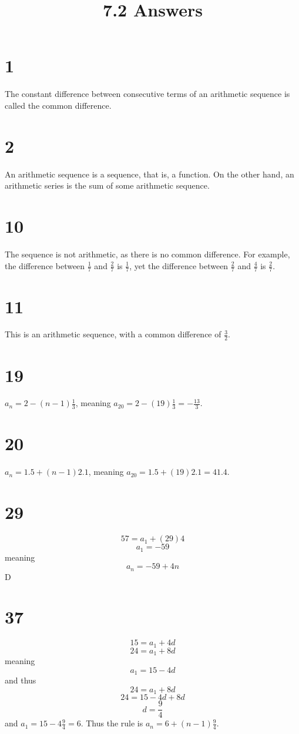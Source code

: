 \documentclass{article}
\title{7.2 Answers}
\theoremstyle{definition}
\newcommand{\?}{\stackrel{?}{=}}
\begin{document}
\maketitle

\section*{1}
The constant difference between consecutive terms of an arithmetic sequence is called the common difference.

\section*{2}
An arithmetic sequence is a sequence, that is, a function. On the other hand, an arithmetic series is the sum of some arithmetic sequence.

\section*{10}
The sequence is not arithmetic, as there is no common difference. For example, the difference between $\frac{1}{7}$ and $\frac{2}{7}$ is $\frac{1}{7}$, yet the difference between 
$\frac{2}{7}$ and $\frac{4}{7}$ is $\frac{2}{7}$.

\section*{11}
This is an arithmetic sequence, with a common difference of $\frac{3}{2}$.

\section*{19}
$a_n=2-(n-1)\frac{1}{3}$, meaning $a_{20}=2-(19)\frac{1}{3}=-\frac{13}{3}$.

\section*{20}
$a_n=1.5+(n-1)2.1$, meaning $a_{20}=1.5+(19)2.1=41.4$.

\section*{29}
\[ 57=a_1+(29)4 \] \[ a_1=-59 \] meaning \[ a_n=-59+4n \] D

\section*{37}
\[ 15=a_1+4d \] \[ 24=a_1+8d \] meaning \[ a_1=15-4d \] and thus \[ 24=a_1+8d \] \[ 24=15-4d+8d \] \[ d=\frac{9}{4} \]
and $a_1=15-4\frac{9}{4}=6$. Thus the rule is $a_n=6+(n-1)\frac{9}{4}$.
\end{document}
